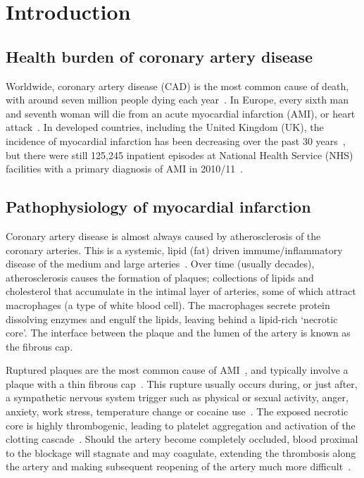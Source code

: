 \chapter{Introduction}
\label{introduction}


\section{Health burden of coronary artery disease}
\label{healthburdenofcoronaryarterydisease}

Worldwide, coronary artery disease (CAD) is the most common cause of death, with around seven million people dying each year~\citep{steg_esc_2012}. In Europe, every sixth man and seventh woman will die from an acute myocardial infarction (AMI), or heart attack~\citep{widimsky_reperfusion_2009}. In developed countries, including the United Kingdom (UK), the incidence of myocardial infarction has been decreasing over the past 30 years~\citep{bilgi_interpretation_2012}, but there were still 125,245 inpatient episodes at National Health Service (NHS) facilities with a primary diagnosis of AMI in 2010\slash 11~\citep{british_heart_foundation_health_promotion_research_group_coronary_2012}. 

\section{Pathophysiology of myocardial infarction}
\label{pathophysiologyofmyocardialinfarction}

Coronary artery disease is almost always caused by atherosclerosis of the coronary arteries. This is a systemic, lipid (fat) driven immume\slash inflammatory disease of the medium and large arteries~\citep{falk_pathology_2003}. Over time (usually decades), atherosclerosis causes the formation of plaques; collections of lipids and cholesterol that accumulate in the intimal layer of
arteries, some of which attract macrophages (a type of white blood cell). The macrophages secrete protein dissolving enzymes and engulf the lipids, leaving behind a lipid-rich `necrotic core'. The interface between the plaque and the lumen of the artery is known as the fibrous cap.

Ruptured plaques are the most common cause of AMI~\citep{sakakura_pathophysiology_2013}, and typically involve a plaque with a thin fibrous cap~\citep{windecker_future_2013}. This rupture usually occurs during, or just after, a sympathetic nervous system trigger such as physical or sexual activity, anger, anxiety, work stress, temperature change or cocaine use~\citep{mittleman_physical_2011}. The exposed necrotic core is highly thrombogenic, leading to platelet aggregation and activation of the clotting cascade~\citep{curzen_what_2013}. Should the artery become completely occluded, blood proximal to the blockage will stagnate and may coagulate, extending the thrombosis along the artery and making subsequent reopening of the artery much more difficult~\citep{falk_pathology_2003}.

